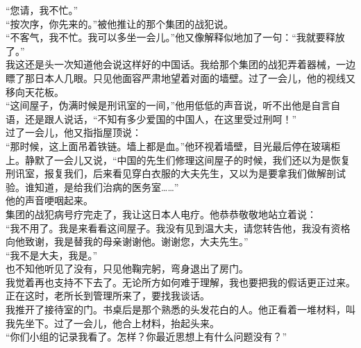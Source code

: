 “您请，我不忙。”\\

“按次序，你先来的。”被他推让的那个集团的战犯说。\\

“不客气，我不忙。我可以多坐一会儿。”他又像解释似地加了一句：“我就要释放了。”\\

我这还是头一次知道他会说这样好的中国话。我给那个集团的战犯弄着器械，一边瞟了那日本人几眼。只见他面容严肃地望着对面的墙壁。过了一会儿，他的视线又移向天花板。\\

“这间屋子，伪满时候是刑讯室的一间，”他用低低的声音说，听不出他是自言自语，还是跟人说话，“不知有多少爱国的中国人，在这里受过刑呵！”\\

过了一会儿，他又指指屋顶说：\\

“那时候，这上面吊着铁链。墙上都是血。”他环视着墙壁，目光最后停在玻璃柜上。静默了一会儿又说，“中国的先生们修理这间屋子的时候，我们还以为是恢复刑讯室，报复我们，后来看见穿白衣服的大夫先生，又以为是要拿我们做解剖试验。谁知道，是给我们治病的医务室……”\\

他的声音哽咽起来。\\

集团的战犯病号疗完走了，我让这日本人电疗。他恭恭敬敬地站立着说：\\

“我不用了。我是来看看这间屋子。我没有见到温大夫，请您转告他，我没有资格向他致谢，我是替我的母亲谢谢他。谢谢您，大夫先生。”\\

“我不是大夫，我是。”\\

也不知他听见了没有，只见他鞠完躬，弯身退出了房门。\\

我觉着再也支持不下去了。无论所方如何难于理解，我也要把我的假话更正过来。\\

正在这时，老所长到管理所来了，要找我谈话。\\

我推开了接待室的门。书桌后是那个熟悉的头发花白的人。他正看着一堆材料，叫我先坐下。过了一会儿，他合上材料，抬起头来。\\

“你们小组的记录我看了。怎样？你最近思想上有什么问题没有？”\\

